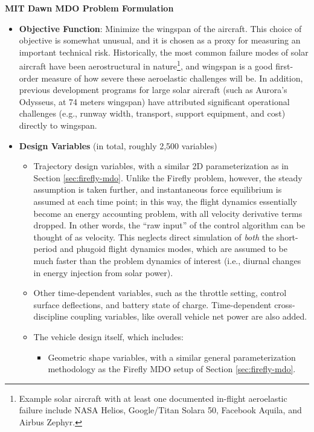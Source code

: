 \begin{example}
    \textbf{MIT Dawn MDO Problem Formulation}

    \begin{itemize}
        \item \textbf{Objective Function}: Minimize the wingspan of the aircraft. This choice of objective is somewhat unusual, and it is chosen as a proxy for measuring an important technical risk. Historically, the most common failure modes of solar aircraft have been aerostructural in nature\footnote{Example solar aircraft with at least one documented in-flight aeroelastic failure include NASA Helios, Google/Titan Solara 50, Facebook Aquila, and Airbus Zephyr.}, and wingspan is a good first-order measure of how severe these aeroelastic challenges will be. In addition, previous development programs for large solar aircraft (such as Aurora’s Odysseus, at 74 meters wingspan) have attributed significant operational challenges (e.g., runway width, transport, support equipment, and cost) directly to wingspan.

        \item \textbf{Design Variables} (in total, roughly 2,500 variables)
        \begin{itemize}
            \item Trajectory design variables, with a similar 2D parameterization as in Section \ref{sec:firefly-mdo}. Unlike the Firefly problem, however, the steady assumption is taken further, and instantaneous force equilibrium is assumed at each time point; in this way, the flight dynamics essentially become an energy accounting problem, with all velocity derivative terms dropped. In other words, the ``raw input'' of the control algorithm can be thought of as velocity. This neglects direct simulation of \emph{both} the short-period and phugoid flight dynamics modes, which are assumed to be much faster than the problem dynamics of interest (i.e., diurnal changes in energy injection from solar power).

            \item Other time-dependent variables, such as the throttle setting, control surface deflections, and battery state of charge. Time-dependent cross-discipline coupling variables, like overall vehicle net power are also added.

            \item The vehicle design itself, which includes:
            \begin{itemize}
                \item Geometric shape variables, with a similar general parameterization methodology as the Firefly MDO setup of Section \ref{sec:firefly-mdo}.


\end{itemize}
\end{itemize}
\end{itemize}
\end{example}
